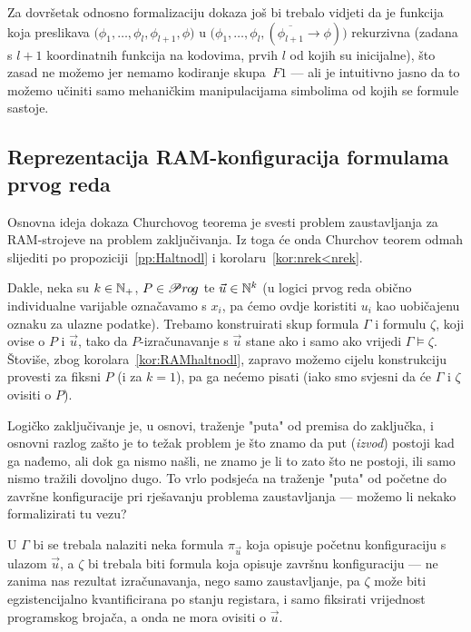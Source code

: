 Za dovršetak odnosno formalizaciju dokaza još bi trebalo vidjeti da je funkcija koja preslikava $\bigl(\phi_1,\dotsc,\phi_l,\phi_{l+1},\phi\bigr)$ u $\bigl(\phi_1,\dotsc,\phi_l,(\overline{\phi_{l+1}}\to\phi)\bigr)$ rekurzivna (zadana s $l+1$ koordinatnih funkcija na kodovima, prvih $l$ od kojih su inicijalne), što zasad ne možemo jer nemamo kodiranje skupa~$F1$ --- ali je intuitivno jasno da to možemo učiniti samo mehaničkim manipulacijama simbolima od kojih se formule sastoje.

\subsection{Reprezentacija RAM-konfiguracija formulama prvog reda}

Osnovna ideja dokaza Churchovog teorema je svesti problem zaustavljanja za RAM-strojeve na problem zaključivanja. Iz toga će onda Churchov teorem odmah slijediti po propoziciji~\ref{pp:Haltnodl} i korolaru~\ref{kor:nrek<nrek}.

Dakle, neka su $k\in{\mathbb N}_+$, $P\in\mathscr Pr\mspace{-1mu}o\mspace{-2mu}g$ te $\vec u\in{\mathbb N}^k$ (u logici prvog reda obično individualne varijable označavamo s $x_i$, pa ćemo ovdje koristiti $u_i$ kao uobičajenu oznaku za ulazne podatke). Trebamo konstruirati skup formula $\Gamma$ i formulu $\zeta$, koji ovise o $P$ i $\vec u$, tako da $P$-izračunavanje s $\vec u$ stane ako i samo ako vrijedi $\Gamma\models\zeta$. Štoviše, zbog korolara~\ref{kor:RAMhaltnodl}, zapravo možemo cijelu konstrukciju provesti za fiksni $P$ (i za $k=1$), pa ga nećemo pisati (iako smo svjesni da će $\Gamma$ i $\zeta$ ovisiti o $P$).

Logičko zaključivanje je, u osnovi, traženje "puta" od premisa do zaključka, i osnovni razlog zašto je to težak problem je što znamo da put (\hspace{-1pt}\emph{izvod}) postoji kad ga nađemo, ali dok ga nismo našli, ne znamo je li to zato što ne postoji, ili samo nismo tražili dovoljno dugo. To vrlo podsjeća na traženje "puta" od početne do završne konfiguracije pri rješavanju problema zaustavljanja --- možemo li nekako formalizirati tu vezu?

U $\Gamma$ bi se trebala nalaziti neka formula $\pi_{\vec u}$ koja opisuje početnu konfiguraciju s ulazom $\vec u$, a $\zeta$ bi trebala biti formula koja opisuje završnu konfiguraciju --- ne zanima nas rezultat izračunavanja, nego samo zaustavljanje, pa $\zeta$ može biti egzistencijalno kvantificirana po stanju registara, i samo fiksirati vrijednost programskog brojača, a onda ne mora ovisiti o $\vec u$.

